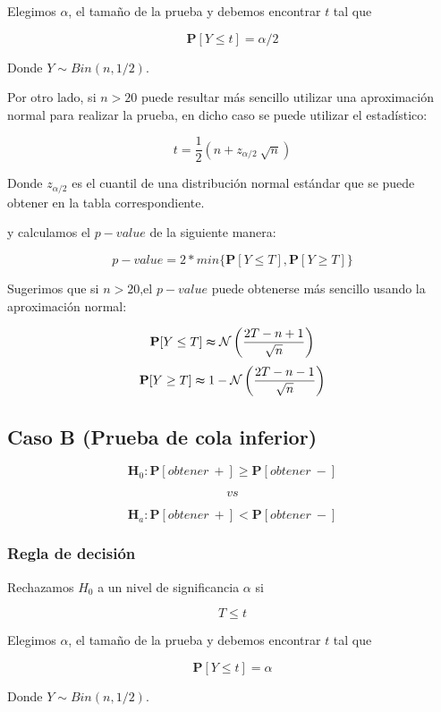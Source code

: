 \documentclass[
  a4paper,
  oneside,
  openany]{book}
\begin{document}
Elegimos \(\alpha\), el tamaño de la prueba y debemos encontrar \(t\) tal que

\[\mathbf{P}[Y \leq t]=\alpha/2\]

Donde \(Y \sim Bin (n,1/2)\).

Por otro lado, si \(n>20\) puede resultar más sencillo utilizar una aproximación normal para realizar la prueba, en dicho caso se puede utilizar el estadístico:

\[t=\frac{1}{2}\left(n+z_{\alpha/2}\ \sqrt{n}\right)\]

Donde \(z_{\alpha/2}\) es el cuantil de una distribución normal estándar que se puede obtener en la tabla correspondiente.

y calculamos el \(p-value\) de la siguiente manera:

\[p-value=2*min\{\mathbf{P}[Y\leq T],\mathbf{P}[Y\geq T]\}\]

Sugerimos que si \(n>20\),el \(p-value\) puede obtenerse más sencillo usando la aproximación normal:

\[\mathbf{P}[Y\leq T] \thickapprox  \mathcal{N} \left(\frac{2T-n+1}{\sqrt{n}}\right)\]
\[\mathbf{P}[Y\geq T] \thickapprox 1- \mathcal{N} \left(\frac{2T-n-1}{\sqrt{n}}\right)\]

\hypertarget{caso-b-prueba-de-cola-inferior-3}{%
\subsection*{Caso B (Prueba de cola inferior)}\label{caso-b-prueba-de-cola-inferior-3}}


\[\textbf{H}_0: \mathbf{P}[obtener\ +] \geq \mathbf{P}[obtener\ -]\]

\[vs\]

\[\textbf{H}_a: \mathbf{P}[obtener\ +] < \mathbf{P}[obtener\ -]\]

\hypertarget{regla-de-decisiuxf3n-11}{%
\subsubsection*{Regla de decisión}\label{regla-de-decisiuxf3n-11}}


Rechazamos \(H_0\) a un nivel de significancia \(\alpha\) si

\[T \leq t\]

Elegimos \(\alpha\), el tamaño de la prueba y debemos encontrar \(t\) tal que

\[\mathbf{P}[Y \leq t]=\alpha\]

Donde \(Y \sim Bin (n,1/2)\).
\end{document}
